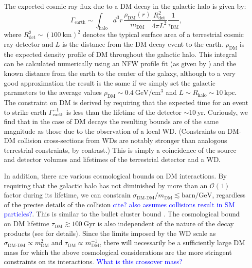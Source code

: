 \documentclass[twocolumn, preprintnumbers,amsmath,amssymb,prd, superscriptaddress]{revtex4}
\newcommand{\OO}{\mathcal{O}}
\newcommand{\GeV}{\text{GeV}}
\newcommand{\cm}{\text{cm}}
\begin{document}
The expected cosmic ray flux due to a DM decay in the galactic halo is given by:
\begin{equation}
\Gamma_\text{earth} \sim \int_{\text{halo}} d^3 r \, \frac{\rho_\text{DM}(r)}{m_\text{DM}} \frac{R_\text{det}^2}{4 \pi L^2} \frac{1}{\tau_\text{DM}},
\end{equation}
where $R_\text{det}^2 \sim (100 ~\text{km})^2$ denotes the typical surface area of a terrestrial cosmic ray detector and $L$ is the distance from the DM decay event to the earth.
$\rho_\text{DM}$ is the expected density profile of DM throughout the galactic halo.
This integral can be calculated numerically using an NFW profile fit (as given by \cite{Nesti:2013uwa}) and the known distance from the earth to the center of the galaxy, although to a very good approximation the result is the same if we simply set the galactic parameters to the average values $\rho_\text{DM} \sim 0.4 ~\GeV/\cm^3$ and $L \sim R_\text{halo} \sim 10 ~\text{kpc}$.
The constraint on DM is derived by requiring that the expected time for an event to strike earth $\Gamma_\text{earth}^{-1}$ is less than the lifetime of the detector $\sim 10 ~\text{yr}$.
Curiously, we find that in the case of DM decays the resulting bounds are of the same magnitude as those due to the observation of a local WD.
(Constraints on DM-DM collision cross-sections from WDs are notably stronger than analogous terrestrial constraints, by contrast.)
This is simply a coincidence of the source and detector volumes and lifetimes of the terrestrial detector and a WD.

In addition, there are various cosmological bounds on DM interactions.
By requiring that the galactic halo has not diminished by more than an $\OO(1)$ factor during its lifetime, we can constrain $\sigma_\text{DM-DM}/m_\text{DM} \lesssim \text{barn}/\GeV$, regardless of the precise details of the collision \textcolor{blue}{cite? also assumes collisions result in SM particles?}.
This is similar to the bullet cluster bound \cite{Randall:2007ph}.
The cosmological bound on DM lifetime $\tau_\text{DM} \gtrsim 100 ~\text{Gyr}$ is also independent of the nature of the decay products (see \cite{Poulin:2016nat} for details).
Since the limits imposed by the WD scale as $\sigma_\text{DM-DM} \propto m_\text{DM}^2$ and $\tau_\text{DM} \propto m_\text{DM}^{-1}$, there will necessarily be a sufficiently large DM mass for which the above cosmological considerations are the more stringent constraints on its interactions.
\textcolor{blue}{What is this crossover mass?}
\end{document}
